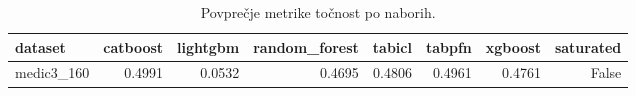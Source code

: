 \begin{table}[htbp]
\centering
\caption{Povprečje metrike točnost po naborih.}
\label{tab:pivot}
\begin{tabular}{lrrrrrrr}
\hline
dataset & catboost & lightgbm & random\_forest & tabicl & tabpfn & xgboost & saturated \\
\hline
medic3\_160 & 0.4991 & 0.0532 & 0.4695 & 0.4806 & 0.4961 & 0.4761 & False \\
\hline
\end{tabular}
\end{table}
